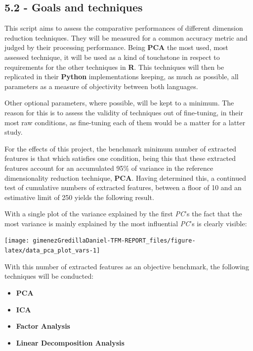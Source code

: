 \documentclass[]{article}
\begin{document}
\subsection{5.2 - Goals and techniques}\label{goals-and-techniques}

This script aims to assess the comparative performances of different
dimension reduction techniques. They will be measured for a common
accuracy metric and judged by their processing performance. Being
\textbf{PCA} the most used, most assessed technique, it will be used as
a kind of touchstone in respect to requirements for the other techniques
in \textbf{R}. This techniques will then be replicated in their
\textbf{Python} implementations keeping, as much as possible, all
parameters as a measure of objectivity between both languages.

Other optional parameters, where possible, will be kept to a minimum.
The reason for this is to assess the validity of techniques out of
fine-tuning, in their most raw conditions, as fine-tuning each of them
would be a matter for a latter study.

For the effects of this project, the benchmark minimum number of
extracted features is that which satisfies one condition, being this
that these extracted features account for an accumulated 95\% of
variance in the reference dimensionality reduction technique,
\textbf{PCA}. Having determined this, a continued test of cumulative
numbers of extracted features, between a floor of 10 and an estimative
limit of 250 yields the following result.

With a single plot of the variance explained by the first \emph{PC}'s
the fact that the most variance is mainly explained by the most
influential \emph{PC}'s is clearly visible:

\texttt{[image: gimenezGredillaDaniel-TFM-REPORT\_files/figure-latex/data\_pca\_plot\_vars-1]}

With this number of extracted features as an objective benchmark, the
following techniques will be conducted:

\begin{itemize}
\itemsep1pt\parskip0pt
\item
  \textbf{PCA}\\
\item
  \textbf{ICA}\\
\item
  \textbf{Factor Analysis}\\
\item
  \textbf{Linear Decomposition Analysis}
\end{itemize}
\end{document}
